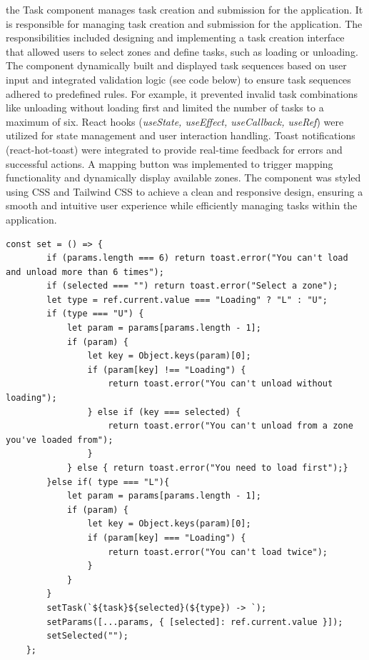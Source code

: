 \documentclass[../../main]{subfiles}
\begin{document}
the Task component manages task creation and submission for the
application. It is responsible for managing task creation and submission
for the application. The responsibilities included designing and
implementing a task creation interface that allowed users to select
zones and define tasks, such as loading or unloading. The component
dynamically built and displayed task sequences based on user input and
integrated validation logic (see code below) to ensure task sequences
adhered to predefined rules. For example, it prevented invalid task
combinations like unloading without loading first and limited the number
of tasks to a maximum of six. React hooks (\emph{useState, useEffect,
useCallback, useRef}) were utilized for state management and user
interaction handling. Toast notifications (react-hot-toast) were
integrated to provide real-time feedback for errors and successful
actions. A mapping button was implemented to trigger mapping
functionality and dynamically display available zones. The component was
styled using CSS and Tailwind CSS to achieve a clean and responsive
design, ensuring a smooth and intuitive user experience while
efficiently managing tasks within the application.
\begin{codebox}[]{}
  
  \begin{verbatim}
const set = () => {
        if (params.length === 6) return toast.error("You can't load and unload more than 6 times");
        if (selected === "") return toast.error("Select a zone");
        let type = ref.current.value === "Loading" ? "L" : "U";
        if (type === "U") {
            let param = params[params.length - 1];
            if (param) {
                let key = Object.keys(param)[0];
                if (param[key] !== "Loading") {
                    return toast.error("You can't unload without loading");
                } else if (key === selected) {
                    return toast.error("You can't unload from a zone you've loaded from");
                }
            } else { return toast.error("You need to load first");}
        }else if( type === "L"){
            let param = params[params.length - 1];
            if (param) {
                let key = Object.keys(param)[0];
                if (param[key] === "Loading") {
                    return toast.error("You can't load twice");
                }
            }
        }
        setTask(`${task}${selected}(${type}) -> `);
        setParams([...params, { [selected]: ref.current.value }]);
        setSelected("");
    };
\end{verbatim}
\end{codebox}
\end{document}
